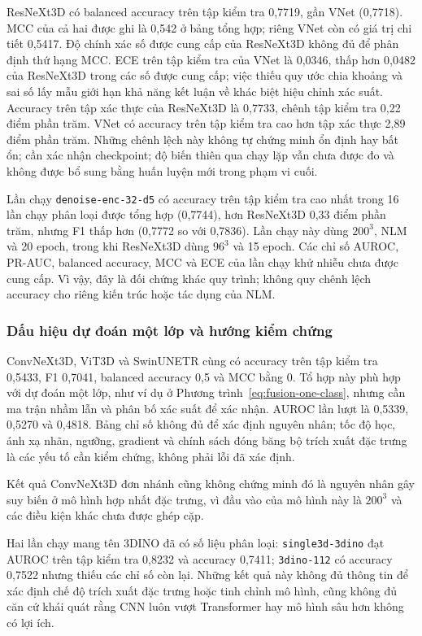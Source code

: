 \documentclass[14pt,a4paper,oneside]{extreport}
\begin{document}
ResNeXt3D có balanced accuracy trên tập kiểm tra 0,7719, gần VNet (0,7718).
MCC của cả hai được ghi là 0,542 ở bảng tổng hợp; riêng VNet còn có
giá trị chi tiết 0,5417. Độ chính xác số được cung cấp của ResNeXt3D không đủ để phân định
thứ hạng MCC. ECE trên tập kiểm tra của VNet là 0,0346, thấp hơn 0,0482 của
ResNeXt3D trong các số được cung cấp; việc thiếu quy ước chia khoảng và
sai số lấy mẫu giới hạn khả năng kết luận về khác biệt hiệu chỉnh xác suất.
Accuracy trên tập xác thực của ResNeXt3D là 0,7733, chênh tập kiểm tra 0,22 điểm
phần trăm. VNet có accuracy trên tập kiểm tra cao hơn tập xác thực 2,89 điểm phần
trăm. Những chênh lệch này không tự chứng minh ổn định hay bất ổn;
cần xác nhận checkpoint; độ biến thiên qua chạy lặp vẫn chưa được đo
và không được bổ sung bằng huấn luyện mới trong phạm vi cuối.

Lần chạy \texttt{denoise-enc-32-d5} có accuracy trên tập kiểm tra cao nhất trong 16 lần chạy
phân loại được tổng hợp (0,7744), hơn ResNeXt3D 0,33 điểm phần trăm,
nhưng F1 thấp hơn (0,7772 so với 0,7836). Lần chạy này dùng $200^3$, NLM
và 20 epoch, trong khi ResNeXt3D dùng $96^3$ và 15 epoch. Các chỉ số
AUROC, PR-AUC, balanced accuracy, MCC và ECE của lần chạy khử nhiễu chưa
được cung cấp. Vì vậy, đây là đối chứng khác quy trình; không quy
chênh lệch accuracy cho riêng kiến trúc hoặc tác dụng của NLM.

\subsubsection{Dấu hiệu dự đoán một lớp và hướng kiểm chứng}
ConvNeXt3D, ViT3D và SwinUNETR cùng có accuracy trên tập kiểm tra 0,5433, F1 0,7041,
balanced accuracy 0,5 và MCC bằng 0. Tổ hợp này phù hợp với dự đoán
một lớp, như ví dụ ở Phương trình~\eqref{eq:fusion-one-class}, nhưng
cần ma trận nhầm lẫn và phân bố xác suất để xác nhận. AUROC lần lượt
là 0,5339, 0,5270 và 0,4818. Bảng chỉ số không đủ để xác định nguyên nhân;
tốc độ học, ánh xạ nhãn, ngưỡng, gradient và chính sách đóng băng
bộ trích xuất đặc trưng là các yếu tố cần kiểm chứng, không phải lỗi đã xác định.

Kết quả ConvNeXt3D đơn nhánh cũng không chứng minh đó là nguyên nhân
gây suy biến ở mô hình hợp nhất đặc trưng, vì đầu vào của mô hình này là $200^3$ và các điều kiện
khác chưa được ghép cặp.

Hai lần chạy mang tên 3DINO đã có số liệu phân loại: \texttt{single3d-3dino}
đạt AUROC trên tập kiểm tra 0,8232 và accuracy 0,7411; \texttt{3dino-112} có
accuracy 0,7522 nhưng thiếu các chỉ số còn lại. Những kết quả này
không đủ thông tin để xác định chế độ trích xuất đặc trưng hoặc
tinh chỉnh mô hình, cũng không đủ căn cứ khái quát rằng CNN
luôn vượt Transformer hay mô hình sâu hơn không có lợi ích.
\end{document}
